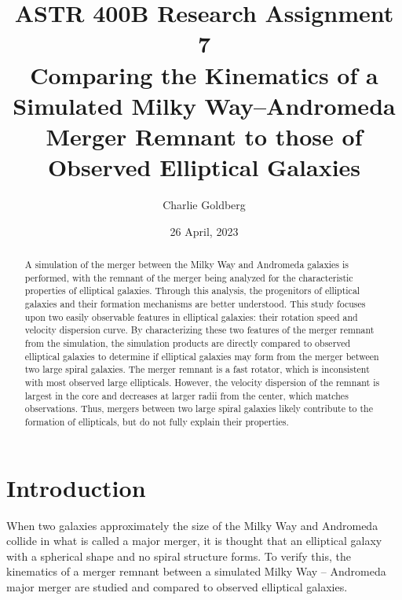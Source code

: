 \documentclass[twocolumn]{aastex63}
\begin{document}
\title{ASTR 400B Research Assignment 7 \\
Comparing the Kinematics of a Simulated Milky Way--Andromeda Merger Remnant to those of Observed Elliptical Galaxies}

\author[0000-0002-4901-7693]{Charlie Goldberg}


\date{26 April, 2023}


\begin{abstract}
    A simulation of the merger between the Milky Way and Andromeda galaxies is performed, with the remnant of the merger being analyzed for the characteristic properties of elliptical galaxies. Through this analysis, the progenitors of elliptical galaxies and their formation mechanisms are better understood. This study focuses upon two easily observable features in elliptical galaxies: their rotation speed and velocity dispersion curve. By characterizing these two features of the merger remnant from the simulation, the simulation products are directly compared to observed elliptical galaxies to determine if elliptical galaxies may form from the merger between two large spiral galaxies. The merger remnant is a fast rotator, which is inconsistent with most observed large ellipticals. However, the velocity dispersion of the remnant is largest in the core and decreases at larger radii from the center, which matches observations. Thus, mergers between two large spiral galaxies likely contribute to the formation of ellipticals, but do not fully explain their properties.
\end{abstract}

\section{Introduction}

When two galaxies approximately the size of the Milky Way and Andromeda collide in what is called a major merger, it is thought that an elliptical galaxy with a spherical shape and no spiral structure forms. To verify this, the kinematics of a merger remnant between a simulated Milky Way -- Andromeda major merger are studied and compared to observed elliptical galaxies.\\
\end{document}
